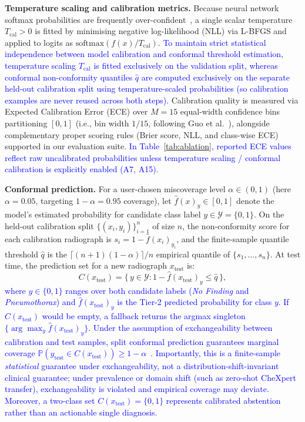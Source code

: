 \documentclass[diagnostics,article,submit,moreauthors]{Definitions/mdpi}
\newcommand{\rev}[1]{\textcolor{blue}{#1}}
\begin{document}
\textbf{Temperature scaling and calibration metrics.} Because neural network softmax probabilities are frequently over-confident~\cite{guo2017calibration}, a single scalar temperature $T_{\text{cal}} > 0$ is fitted by minimising negative log-likelihood (NLL) via L-BFGS and applied to logits as $\mathrm{softmax}(f(x)/T_{\text{cal}})$. \rev{To maintain strict statistical independence between model calibration and conformal threshold estimation, temperature scaling $T_{\text{cal}}$ is fitted exclusively on the validation split, whereas conformal non-conformity quantiles $\hat{q}$ are computed exclusively on the separate held-out calibration split using temperature-scaled probabilities (so calibration examples are never reused across both steps).} Calibration quality is measured via Expected Calibration Error (ECE) over $M=15$ equal-width confidence bins partitioning $[0,1]$ (i.e., bin width $1/15$, following Guo et al.~\cite{guo2017calibration}), alongside complementary proper scoring rules (Brier score, NLL, and class-wise ECE) supported in our evaluation suite. \rev{In Table~\ref{tab:ablation}, reported ECE values reflect raw uncalibrated probabilities unless temperature scaling / conformal calibration is explicitly enabled (A7, A15).}

\textbf{Conformal prediction.} For a user-chosen miscoverage level $\alpha \in (0,1)$ (here $\alpha=0.05$, targeting $1-\alpha=0.95$ coverage), let $\hat{f}(x)_y \in [0,1]$ denote the model's estimated probability for candidate class label $y \in \mathcal{Y} = \{0, 1\}$. On the held-out calibration split $\{(x_i, y_i)\}_{i=1}^{n}$ of size $n$, the non-conformity score for each calibration radiograph is $s_i = 1 - \hat{f}(x_i)_{y_i}$, and the finite-sample quantile threshold $\hat{q}$ is the $\lceil(n+1)(1-\alpha)\rceil / n$ empirical quantile of $\{s_1,\dots,s_n\}$. At test time, the prediction set for a new radiograph $x_{\text{test}}$ is:
\begin{equation}
C(x_{\text{test}}) = \{\, y \in \mathcal{Y} : 1 - \hat{f}(x_{\text{test}})_y \le \hat{q}\,\},
\label{eq:conformal}
\end{equation}
\rev{where $y \in \{0, 1\}$ ranges over both candidate labels (\emph{No Finding} and \emph{Pneumothorax}) and $\hat{f}(x_{\text{test}})_y$ is the Tier-2 predicted probability for class $y$. If $C(x_{\text{test}})$ would be empty, a fallback returns the argmax singleton $\{\arg\max_y \hat{f}(x_{\text{test}})_y\}$. Under the assumption of exchangeability between calibration and test samples, split conformal prediction guarantees marginal coverage $\mathbb{P}(y_{\text{test}} \in C(x_{\text{test}})) \ge 1 - \alpha$~\cite{vovk2005algorithmic, shafer2008tutorial}. Importantly, this is a finite-sample \emph{statistical} guarantee under exchangeability, not a distribution-shift-invariant clinical guarantee; under prevalence or domain shift (such as zero-shot CheXpert transfer), exchangeability is violated and empirical coverage may deviate. Moreover, a two-class set $C(x_{\text{test}})=\{0,1\}$ represents calibrated abstention rather than an actionable single diagnosis.}
\end{document}
